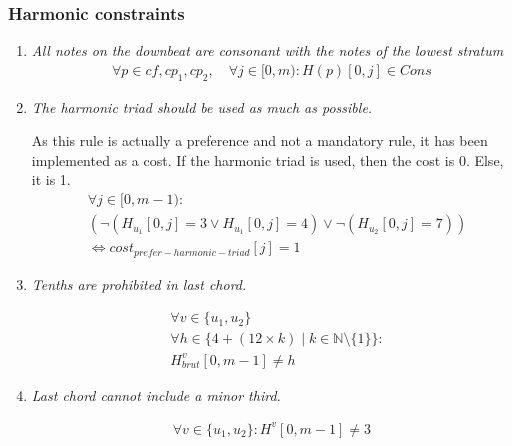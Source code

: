\subsubsection{Harmonic constraints}
\begin{enumerate}[wide, label=\bfseries 1.H\arabic*]        
    \item\label{constraint:consonant} \textit{All notes on the downbeat are consonant with the notes of the lowest stratum}
   \begin{equation}
    \begin{aligned}
        \forall p \in {cf, cp_1, cp_2}, \quad \forall j \in [0, m) : H(p)[0, j] \in Cons
    \end{aligned}
   \end{equation}
    
    \setcounter{enumi}{7} %

    \item\label{constraint:harmonic-triad} \reddot \textit{The harmonic triad should be used as much as possible.}
    
    As this rule is actually a preference and not a mandatory rule, it has been implemented as a cost. If the harmonic triad is used, then the cost is 0. Else, it is 1.
    \begin{equation}
    \begin{aligned}
    &\forall j \in [0, m-1) \colon \\
    &(\neg (H_{u_1}[0, j] = 3 \lor H_{u_1}[0, j] = 4) \lor \neg (H_{u_2}[0, j] = 7)) \\
    &\iff cost_{prefer-harmonic-triad}[j] = 1
    \end{aligned}
    \end{equation}
    
    \setcounter{enumi}{9} %


    \item\label{constraint:tenth-is-last-chord} \reddot \textit{Tenths are prohibited in last chord.}

    \begin{equation} \begin{aligned}
    &\forall v \in \{u_1, u_2\} \quad \\
    &\forall h \in \{4 + (12 \times k) \mid k \in \mathbb{N} \setminus \{1\}\} \colon \\
    &H_{brut}^{v}[0, m-1] \neq h
    \end{aligned} \end{equation}

    \setcounter{enumi}{11} %

    \item\label{constraint:minor-third} \reddot \textit{Last chord cannot include a minor third.}

    \begin{equation} \begin{aligned}
    \forall v \in \{u_1, u_2\} \colon H^{v}[0, m-1] \neq 3
    \end{aligned} \end{equation}
\end{enumerate}
